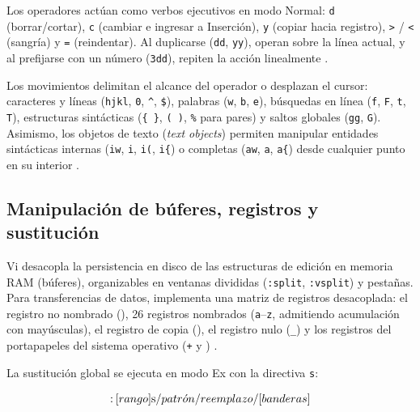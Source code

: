 \documentclass[12pt]{article}
\begin{document}
Los operadores actúan como verbos ejecutivos en modo Normal: \texttt{d} (borrar/cortar), \texttt{c} (cambiar e ingresar a Inserción), \texttt{y} (copiar hacia registro), \texttt{>} / \texttt{<} (sangría) y \texttt{=} (reindentar). Al duplicarse (\texttt{dd}, \texttt{yy}), operan sobre la línea actual, y al prefijarse con un número (\texttt{3dd}), repiten la acción linealmente \parencite[\S 2, p.\ 35]{oualline2001vim}.

Los movimientos delimitan el alcance del operador o desplazan el cursor: caracteres y líneas (\texttt{hjkl}, \texttt{0}, \texttt{\textasciicircum}, \texttt{\$}), palabras (\texttt{w}, \texttt{b}, \texttt{e}), búsquedas en línea (\texttt{f}, \texttt{F}, \texttt{t}, \texttt{T}), estructuras sintácticas (\texttt{\{ \}}, \texttt{( )}, \texttt{\%} para pares) y saltos globales (\texttt{gg}, \texttt{G}). Asimismo, los objetos de texto (\textit{text objects}) permiten manipular entidades sintácticas internas (\texttt{iw}, \texttt{i\textquotedbl}, \texttt{i(}, \texttt{i\{}) o completas (\texttt{aw}, \texttt{a\textquotedbl}, \texttt{a\{}) desde cualquier punto en su interior \parencite{moolenaar2024vim}.

\subsection{Manipulación de búferes, registros y sustitución}
\label{subsec:manipulacionBuferesRegistros}

Vi desacopla la persistencia en disco de las estructuras de edición en memoria RAM (búferes), organizables en ventanas divididas (\texttt{:split}, \texttt{:vsplit}) y pestañas. Para transferencias de datos, implementa una matriz de registros desacoplada: el registro no nombrado (\texttt{\textquotedbl\textquotedbl}), 26 registros nombrados (\texttt{\textquotedbl a}--\texttt{\textquotedbl z}, admitiendo acumulación con mayúsculas), el registro de copia (\texttt{}), el registro nulo (\texttt{\textquotedbl\_}) y los registros del portapapeles del sistema operativo (\texttt{\textquotedbl +} y \texttt{\textquotedbl *}) \parencite{moolenaar2024vim}.

La sustitución global se ejecuta en modo Ex con la directiva \texttt{s}:

\begin{equation}
\label{eq:sustitucionEx}
\text{:\hspace{0.2em}}[rango]\text{s}/patr\acute{o}n/reemplazo/[banderas]
\end{equation}
\end{document}
